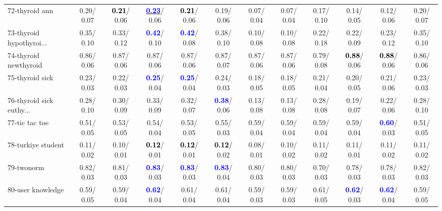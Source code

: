 \begin{table}[h]
\begin{center}
{\begin{tabular}{lc|c|c|c|c|c|c|c|c|c|c}
72-thyroid ann &   0.20/  0.07 & \textcolor{black}{\textbf{  0.21}}/  0.06 & \underline{\textcolor{blue}{\textbf{  0.23}}}/  0.06 & \textcolor{black}{\textbf{  0.21}}/  0.06 &   0.19/  0.06 &   0.07/  0.04 &   0.07/  0.04 &   0.17/  0.10 &   0.14/  0.05 &   0.12/  0.06 &   0.20/  0.07 \\
73-thyroid hypothyroi... &   0.35/  0.10 &   0.33/  0.12 & \textcolor{blue}{\textbf{  0.42}}/  0.10 & \textcolor{blue}{\textbf{  0.42}}/  0.08 &   0.38/  0.10 &   0.10/  0.08 &   0.10/  0.08 &   0.22/  0.18 &   0.22/  0.09 &   0.23/  0.12 &   0.35/  0.10 \\
74-thyroid newthyroid &   0.86/  0.06 &   0.87/  0.06 &   0.87/  0.06 &   0.87/  0.06 &   0.87/  0.07 &   0.87/  0.06 &   0.87/  0.06 &   0.79/  0.08 & \textcolor{black}{\textbf{  0.88}}/  0.06 & \textcolor{black}{\textbf{  0.88}}/  0.06 &   0.86/  0.06 \\
75-thyroid sick &   0.23/  0.03 &   0.22/  0.03 & \textcolor{blue}{\textbf{  0.25}}/  0.04 & \textcolor{blue}{\textbf{  0.25}}/  0.04 &   0.24/  0.03 &   0.18/  0.05 &   0.18/  0.05 &   0.21/  0.04 &   0.20/  0.05 &   0.21/  0.06 &   0.23/  0.03 \\
76-thyroid sick euthy... &   0.28/  0.10 &   0.30/  0.09 &   0.33/  0.09 &   0.32/  0.07 & \textcolor{blue}{\textbf{  0.38}}/  0.06 &   0.13/  0.08 &   0.13/  0.08 &   0.28/  0.08 &   0.19/  0.07 &   0.22/  0.06 &   0.28/  0.10 \\
77-tic tac toe &   0.51/  0.05 &   0.53/  0.05 &   0.54/  0.04 &   0.53/  0.05 &   0.55/  0.03 &   0.59/  0.04 &   0.59/  0.04 &   0.59/  0.04 &   0.59/  0.04 & \textcolor{blue}{\textbf{  0.60}}/  0.03 &   0.51/  0.05 \\
78-turkiye student &   0.11/  0.02 &   0.10/  0.01 & \textcolor{black}{\textbf{  0.12}}/  0.01 & \textcolor{black}{\textbf{  0.12}}/  0.01 & \textcolor{black}{\textbf{  0.12}}/  0.02 &   0.08/  0.01 &   0.10/  0.02 &   0.11/  0.02 &   0.11/  0.01 &   0.11/  0.02 &   0.11/  0.02 \\ \hline
79-twonorm &   0.82/  0.03 &   0.81/  0.03 & \textcolor{blue}{\textbf{  0.83}}/  0.03 & \textcolor{blue}{\textbf{  0.83}}/  0.03 & \textcolor{blue}{\textbf{  0.83}}/  0.04 &   0.80/  0.03 &   0.80/  0.03 &   0.70/  0.03 &   0.78/  0.03 &   0.78/  0.03 &   0.82/  0.03 \\
80-user knowledge &   0.59/  0.05 &   0.59/  0.04 & \textcolor{blue}{\textbf{  0.62}}/  0.04 &   0.61/  0.04 &   0.61/  0.04 &   0.59/  0.03 &   0.59/  0.03 &   0.61/  0.05 & \textcolor{blue}{\textbf{  0.62}}/  0.03 & \textcolor{blue}{\textbf{  0.62}}/  0.04 &   0.59/  0.05 \\

\end{tabular}}
\end{center}
\end{table}
